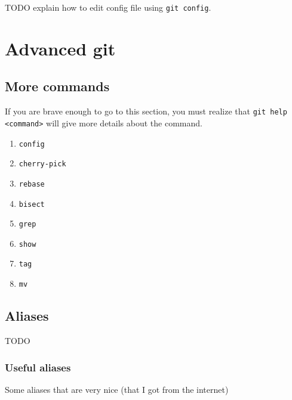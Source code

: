 \documentclass[12pt]{article}
\begin{document}
TODO explain how to edit config file using \texttt{git config}.

\section{Advanced git}

\subsection{More commands}
If you are brave enough to go to this section, you must realize that \texttt{git help <command>} will give more details about the command.

\begin{enumerate}

\item{\texttt{config}}

\item{\texttt{cherry-pick}}

\item{\texttt{rebase}}

\item{\texttt{bisect}}

\item{\texttt{grep}}

\item{\texttt{show}}

\item{\texttt{tag}}

\item{\texttt{mv}}

\end{enumerate}

\subsection{Aliases}
TODO

\subsubsection{Useful aliases}
Some aliases that are very nice (that I got from the internet)
\end{document}

